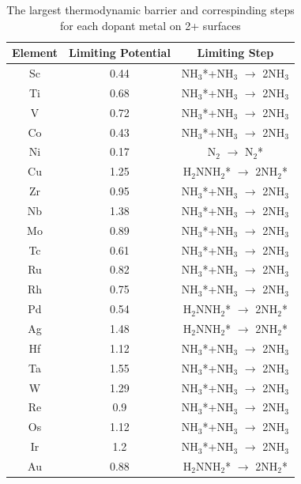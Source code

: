 \begin{table}
\begin{center}
\begin{tabular}{| c | c |c |}
\hline
Element & Limiting Potential & Limiting Step \\
\hline
Sc & 0.44 & NH$_3$*+NH$_3$ $\rightarrow$ 2NH$_3$\\
Ti & 0.68 & NH$_3$*+NH$_3$ $\rightarrow$ 2NH$_3$\\
V & 0.72 & NH$_3$*+NH$_3$ $\rightarrow$ 2NH$_3$\\
Co & 0.43 & NH$_3$*+NH$_3$ $\rightarrow$ 2NH$_3$\\
Ni & 0.17 & N$_2$ $\rightarrow$ N$_2$*\\
Cu & 1.25 & H$_2$NNH$_2$* $\rightarrow$ 2NH$_2$*\\
Zr & 0.95 & NH$_3$*+NH$_3$ $\rightarrow$ 2NH$_3$\\
Nb & 1.38 & NH$_3$*+NH$_3$ $\rightarrow$ 2NH$_3$\\
Mo & 0.89 & NH$_3$*+NH$_3$ $\rightarrow$ 2NH$_3$\\
Tc & 0.61 & NH$_3$*+NH$_3$ $\rightarrow$ 2NH$_3$\\
Ru & 0.82 & NH$_3$*+NH$_3$ $\rightarrow$ 2NH$_3$\\
Rh & 0.75 & NH$_3$*+NH$_3$ $\rightarrow$ 2NH$_3$\\
Pd & 0.54 & H$_2$NNH$_2$* $\rightarrow$ 2NH$_2$*\\
Ag & 1.48 & H$_2$NNH$_2$* $\rightarrow$ 2NH$_2$*\\
Hf & 1.12 & NH$_3$*+NH$_3$ $\rightarrow$ 2NH$_3$\\
Ta & 1.55 & NH$_3$*+NH$_3$ $\rightarrow$ 2NH$_3$\\
W & 1.29 & NH$_3$*+NH$_3$ $\rightarrow$ 2NH$_3$\\
Re & 0.9 & NH$_3$*+NH$_3$ $\rightarrow$ 2NH$_3$\\
Os & 1.12 & NH$_3$*+NH$_3$ $\rightarrow$ 2NH$_3$\\
Ir & 1.2 & NH$_3$*+NH$_3$ $\rightarrow$ 2NH$_3$\\
Au & 0.88 & H$_2$NNH$_2$* $\rightarrow$ 2NH$_2$*\\
\hline
\end{tabular}
\end{center}
\caption{The largest thermodynamic barrier and correspinding steps for each dopant metal on 2+ surfaces}\label{table:limiting_steps}\end{table}\begin{figure}
\centering

\end{figure}

